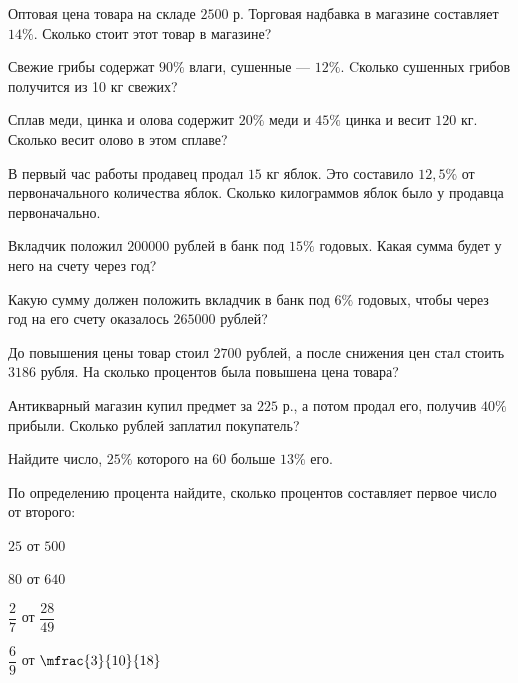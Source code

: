 \begin{class}[number=4]
	\begin{listofex}
		\item Оптовая цена товара на складе \( 2500 \) р. Торговая надбавка в магазине составляет \( 14\% \). Сколько стоит этот товар в магазине?
		\item Свежие грибы содержат \( 90\% \) влаги, сушенные --- \( 12\% \). Cколько сушенных грибов получится из 10 кг свежих?
		\item Сплав меди, цинка и олова содержит \(20\% \) меди и \(45\% \) цинка и весит \(120\) кг. Сколько весит олово в этом сплаве?
		\item В первый час работы продавец продал \( 15 \) кг яблок. Это составило \( 12,5\% \) от первоначального количества яблок. Сколько килограммов яблок было у продавца первоначально.
		\item Вкладчик положил \( 200 000 \) рублей в банк под \( 15\% \) годовых. Какая сумма будет у него на счету через год?
		\item Какую сумму должен положить вкладчик в банк под \( 6\% \) годовых, чтобы через год на его счету оказалось \( 265 000 \) рублей?
		\item До повышения цены товар стоил \( 2700 \) рублей, а после снижения цен стал стоить \( 3186 \) рубля. На сколько процентов была повышена цена товара?
		\item Антикварный магазин купил предмет за \(225\) р., а потом продал его, получив \(40 \%\) прибыли. Сколько рублей заплатил покупатель?
		\item Найдите число, \( 25\% \) которого на \( 60 \) больше \( 13\% \) его.
		\item По определению процента найдите, сколько процентов составляет первое число от второго:
		\begin{enumcols}[itemcolumns=4]
			\item \( 25 \) от \( 500 \)
			\item \( 80 \) от \( 640 \)
			\item \( \dfrac{2}{7} \) от \( \dfrac{28}{49} \)
			\item \( \dfrac{6}{9} \) от \( \mfrac{3}{10}{18} \)
		\end{enumcols}
	\end{listofex}
\end{class}
%
%
